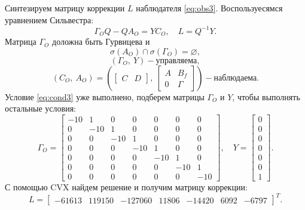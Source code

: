 Синтезируем матрицу коррекции $L$ наблюдателя \eqref{eq:obs3}.
Воспользуесямся уравнением Сильвестра:
\begin{equation*}
    \Gamma_OQ-QA_O=YC_O,\quad L=Q^{-1}Y.
\end{equation*}
Матрица $\Gamma_O$ доложна быть Гурвицева и
\begin{equation}
    \label{eq:cond1}
    \sigma(A_O)\cap\sigma(\Gamma_O)=\varnothing,
\end{equation}
\begin{equation}
    \label{eq:cond2}
    (\Gamma_O,\ Y) - \text{управляема},
\end{equation}
\begin{equation}
    \label{eq:cond3}
    (C_O,\ A_O)=\left( 
        \begin{bmatrix}
            C&D
        \end{bmatrix},\ 
        \begin{bmatrix}
            A&B_f\\0&\Gamma
        \end{bmatrix}
     \right) - \text{наблюдаема}.
\end{equation}
Условие \eqref{eq:cond3} уже выполнено, подберем матрицы $\Gamma_O$ и $Y$,
чтобы выполнять остальные условия:
\begin{equation*}
    \Gamma_O=\begin{bmatrix}
        -10 &  1  &  0  &  0  &  0  &  0  &  0 \\
         0  & -10 &  1  &  0  &  0  &  0  &  0 \\
         0  &  0  & -10 &  1  &  0  &  0  &  0 \\
         0  &  0  &  0  & -10 &  1  &  0  &  0 \\
         0  &  0  &  0  &  0  & -10 &  1  &  0 \\
         0  &  0  &  0  &  0  &  0  & -10 &  1 \\
         0  &  0  &  0  &  0  &  0  &  0  & -10
    \end{bmatrix},\quad
    Y=\begin{bmatrix}
         0 \\
         0 \\
         0 \\
         0 \\
         0 \\
         0 \\
         1
    \end{bmatrix}.
\end{equation*}
С помощью CVX найдем решение и получим матрицу коррекции:
\begin{equation*}
    L=\begin{bmatrix}
        -61613 &
        119150 &
        -127060 &
        11806 &
        -14420 &
        6092 &
        -6797
    \end{bmatrix}^T.
\end{equation*}



